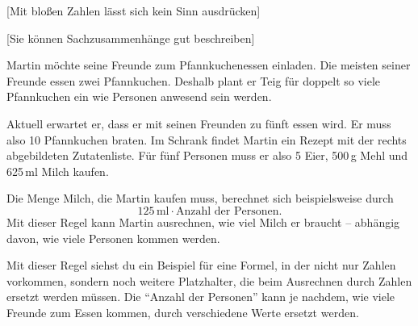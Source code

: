 \documentclass[../../main.tex]{subfiles}
\begin{document}
[Mit bloßen Zahlen lässt sich kein Sinn ausdrücken]

[Sie können Sachzusammenhänge gut beschreiben]

\begin{example}
    
    Martin möchte seine Freunde zum Pfannkuchenessen einladen. Die meisten seiner Freunde essen zwei Pfannkuchen. Deshalb plant er Teig für doppelt so viele Pfannkuchen ein wie Personen anwesend sein werden.
    
    Aktuell erwartet er, dass er mit seinen Freunden zu fünft essen wird. Er muss also 10 Pfannkuchen braten. Im Schrank findet Martin ein Rezept mit der rechts abgebildeten Zutatenliste. Für fünf Personen muss er also 5 Eier, 500\,g Mehl und 625\,ml Milch kaufen.
    
    Die Menge Milch, die Martin kaufen muss, berechnet sich beispielsweise durch \[125\,\text{ml}\cdot\text{Anzahl der Personen}.\]
    Mit dieser Regel kann Martin ausrechnen, wie viel Milch er braucht -- abhängig davon, wie viele Personen kommen werden.
    
    Mit dieser Regel siehst du ein Beispiel für eine Formel, in der nicht nur Zahlen vorkommen, sondern noch weitere Platzhalter, die beim Ausrechnen durch Zahlen ersetzt werden müssen. Die \enquote{Anzahl der Personen} kann je nachdem, wie viele Freunde zum Essen kommen, durch verschiedene Werte ersetzt werden.
\end{example}
\end{document}
